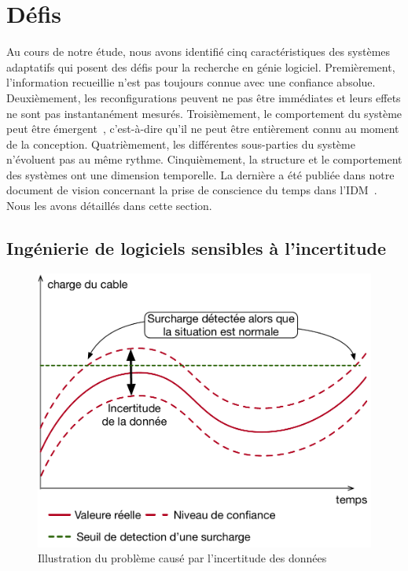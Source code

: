 \section{Défis}

%
Au cours de notre étude, nous avons identifié cinq caractéristiques des systèmes adaptatifs qui posent des défis pour la recherche en génie logiciel. 
Premièrement, l'information recueillie n'est pas toujours connue avec une confiance absolue. 
Deuxièmement, les reconfigurations peuvent ne pas être immédiates et leurs effets ne sont pas instantanément mesurés. 
Troisièmement, le comportement du système peut être émergent~\cite{zio2011uncertainties}, c'est-à-dire qu'il ne peut être entièrement connu au moment de la conception. 
Quatrièmement, les différentes sous-parties du système n'évoluent pas au même rythme. 
Cinquièmement, la structure et le comportement des systèmes ont une dimension temporelle. 
La dernière a été publiée dans notre document de vision concernant la prise de conscience du temps dans l'IDM~\cite{DBLP:conf/models/Benelallam0MFBB17}. 
Nous les avons détaillés dans cette section.

\subsection{Ingénierie de logiciels sensibles à l'incertitude}
\label{sec:french:challenges:duc}

\begin{figure}
	\centering
	\includegraphics[width=.6\linewidth]{img/apdx-french/challenges/duc}
	\caption{Illustration du problème causé par l'incertitude des données}
	\label{fig:french:chal:duc}
\end{figure}

